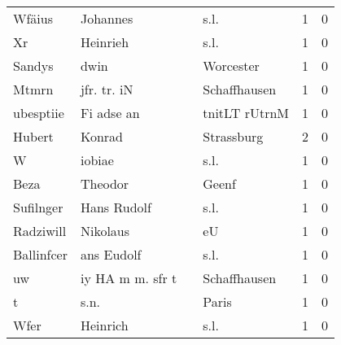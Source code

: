 \documentclass[10pt,a4paper,landscape]{article}
\begin{document}
\begin{longtable}{llllrr}
                   Wfäius &                           Johannes &             &                                        s.l. &          1 &         0 \\
                       Xr &                           Heinrieh &             &                                        s.l. &          1 &         0 \\
                   Sandys &                               dwin &             &                                   Worcester &          1 &         0 \\
                    Mtmrn &                        jfr. tr. iN &             &                                Schaffhausen &          1 &         0 \\
                ubesptiie &                         Fi adse an &             &                               tnitLT rUtrnM &          1 &         0 \\
                   Hubert &                             Konrad &             &                                  Strassburg &          2 &         0 \\
                        W &                             iobiae &             &                                        s.l. &          1 &         0 \\
                     Beza &                            Theodor &             &                                       Geenf &          1 &         0 \\
                Sufilnger &                        Hans Rudolf &             &                                        s.l. &          1 &         0 \\
                Radziwill &                           Nikolaus &             &                                          eU &          1 &         0 \\
               Ballinfcer &                         ans Eudolf &             &                                        s.l. &          1 &         0 \\
                       uw &                   iy HA m m. sfr t &             &                                Schaffhausen &          1 &         0 \\
                        t &                               s.n. &             &                                       Paris &          1 &         0 \\
                     Wfer &                           Heinrich &             &                                        s.l. &          1 &         0 \\

\end{longtable}
\end{document}
